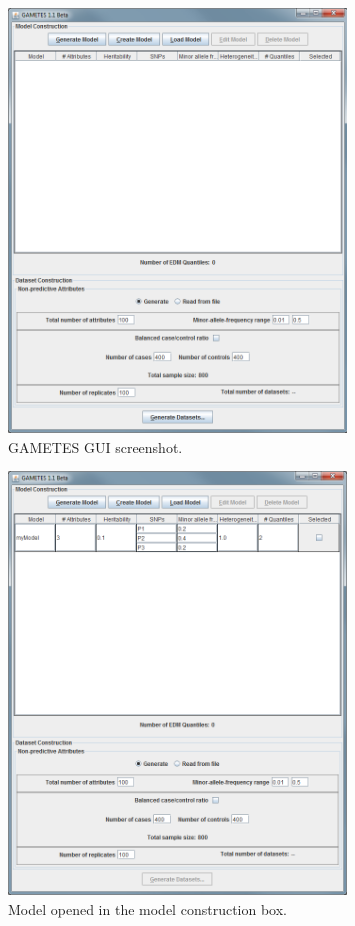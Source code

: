 \documentclass{report}
\begin{document}
\begin{figure}[t]
\centering
\includegraphics[width=0.8\textwidth]{Figure1_UG.png}%
\caption{GAMETES GUI screenshot.}
\label{gui}
\end{figure}

\begin{figure}[t]
\centering
\includegraphics[width=0.8\textwidth]{Figure2_UG.png}%
\caption{Model opened in the model construction box.}
\label{modop}
\end{figure}
\end{document}
